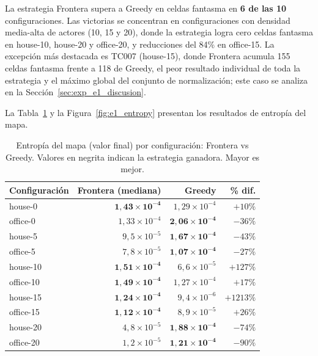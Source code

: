 La estrategia Frontera supera a Greedy en celdas fantasma en \textbf{6 de las 10} configuraciones. Las victorias se concentran en configuraciones con densidad media-alta de actores (10, 15 y 20), donde la estrategia logra cero celdas fantasma en house-10, house-20 y office-20, y reducciones del 84\% en office-15. La excepción más destacada es TC007 (house-15), donde Frontera acumula 155 celdas fantasma frente a 118 de Greedy, el peor resultado individual de toda la estrategia y el máximo global del conjunto de normalización; este caso se analiza en la Sección~\ref{sec:exp_e1_discusion}.

La Tabla~\ref{tab:e1_entropy} y la Figura~\ref{fig:e1_entropy} presentan los resultados de entropía del mapa.

\begin{table}[htbp]
    \centering
    \caption{Entropía del mapa (valor final) por configuración: Frontera vs Greedy. Valores en negrita indican la estrategia ganadora. Mayor es mejor.}%
    \label{tab:e1_entropy}
    \begin{tabular}{lrrr}
        \toprule
        \textbf{Configuración} & \textbf{Frontera (mediana)} & \textbf{Greedy} & \textbf{\% dif.} \\
        \midrule
        house-0   & $\mathbf{1{,}43 \times 10^{-4}}$ & $1{,}29 \times 10^{-4}$ & $+10\%$    \\
        office-0  & $1{,}33 \times 10^{-4}$ & $\mathbf{2{,}06 \times 10^{-4}}$ & $-36\%$   \\
        house-5   & $9{,}5 \times 10^{-5}$  & $\mathbf{1{,}67 \times 10^{-4}}$ & $-43\%$   \\
        office-5  & $7{,}8 \times 10^{-5}$  & $\mathbf{1{,}07 \times 10^{-4}}$ & $-27\%$   \\
        house-10  & $\mathbf{1{,}51 \times 10^{-4}}$ & $6{,}6 \times 10^{-5}$  & $+127\%$  \\
        office-10 & $\mathbf{1{,}49 \times 10^{-4}}$ & $1{,}27 \times 10^{-4}$ & $+17\%$   \\
        house-15  & $\mathbf{1{,}24 \times 10^{-4}}$ & $9{,}4 \times 10^{-6}$  & $+1213\%$ \\
        office-15 & $\mathbf{1{,}12 \times 10^{-4}}$ & $8{,}9 \times 10^{-5}$  & $+26\%$   \\
        house-20  & $4{,}8 \times 10^{-5}$  & $\mathbf{1{,}88 \times 10^{-4}}$ & $-74\%$   \\
        office-20 & $1{,}2 \times 10^{-5}$  & $\mathbf{1{,}21 \times 10^{-4}}$ & $-90\%$   \\
        \bottomrule
    \end{tabular}
\end{table}

